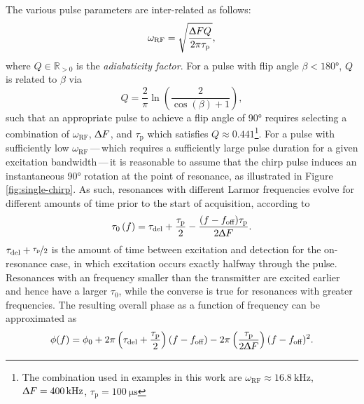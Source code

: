 The various pulse parameters are inter-related as
follows\cite{Foroozandeh2019,Kupce1995b}:
\begin{equation}
    \omega_{\text{RF}} = \sqrt{
        \frac{\Updelta F Q}{2 \pi \tau_{\text{p}}}
    },
\end{equation}
where $Q \in \mathbb{R}_{>0}$ is the \emph{adiabaticity factor}.
For a pulse with flip angle  $\beta < \ang{180}$, $Q$ is related to $\beta$ via
\begin{equation}
    Q = \frac{2}{\pi} \ln \left( \frac{2}{\cos(\beta) + 1} \right),
\end{equation}
such that an appropriate pulse to achieve a flip angle of \ang{90} requires
selecting a combination of $\omega_{\text{RF}}$, $\Updelta F$, and
$\tau_{\text{p}}$ which satisfies $Q \approx 0.441$\footnote{
    The combination used in examples in this work are
    $\omega_{\text{RF}} \approx \qty{16.8}{\kilo\hertz}$,
    $\Updelta F = \qty{400}{\kilo\hertz}$,
    $\tau_{\text{p}} = \qty{100}{\micro\second}$
}.
For a pulse with sufficiently low $\omega_{\text{RF}}$\,---\,which requires a
sufficiently large pulse duration for a given excitation bandwidth\,---\,it is
reasonable to assume that the chirp pulse induces an instantaneous \ang{90}
rotation at the point of resonance, as illustrated in Figure
\ref{fig:single-chirp}. As such, resonances with different
Larmor frequencies evolve for different amounts of time prior to the start of
acquisition, according to
\begin{equation}
    \tau_0\left(f\right) =
        \tau_{\text{del}} + \frac{\tau_{\text{p}}}{2} -
        \frac{(f - f_{\text{off}}) \tau_{\text{p}}}{2 \Updelta F}.
    \label{eq:t0}
\end{equation}
$\tau_{\text{del}} + \nicefrac{\tau_{\text{p}}}{2}$ is the amount of time
between excitation and detection for the on-resonance case, in which
excitation occurs exactly halfway through the pulse. Resonances
with an frequency smaller than the transmitter are excited earlier and hence
have a larger $\tau_0$, while the converse is true for resonances with greater
frequencies. The resulting overall phase as a function of frequency can be
approximated as\cite{Foroozandeh2019}
\begin{equation}
    \phi(f) = \phi_0 + 2 \pi \left(\tau_{\text{del}} + \frac{\tau_{\text{p}}}{2} \right) (f - f_{\text{off}}) -
        2 \pi \left(\frac{\tau_{\text{p}}}{2 \Updelta F}\right)
        (f - f_{\text{off}})^2.
    \label{eq:quadratic-phase}
\end{equation}
